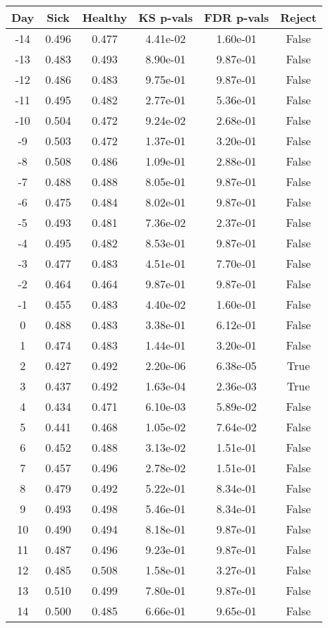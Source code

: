 \begin{tabular}{c|c|c|c|c|c}
Day &  Sick & Healthy &  KS p-vals & FDR p-vals & Reject\\
\hline
-14 & 0.496 &   0.477 &   4.41e-02 &   1.60e-01 &  False\\
-13 & 0.483 &   0.493 &   8.90e-01 &   9.87e-01 &  False\\
-12 & 0.486 &   0.483 &   9.75e-01 &   9.87e-01 &  False\\
-11 & 0.495 &   0.482 &   2.77e-01 &   5.36e-01 &  False\\
-10 & 0.504 &   0.472 &   9.24e-02 &   2.68e-01 &  False\\
 -9 & 0.503 &   0.472 &   1.37e-01 &   3.20e-01 &  False\\
 -8 & 0.508 &   0.486 &   1.09e-01 &   2.88e-01 &  False\\
 -7 & 0.488 &   0.488 &   8.05e-01 &   9.87e-01 &  False\\
 -6 & 0.475 &   0.484 &   8.02e-01 &   9.87e-01 &  False\\
 -5 & 0.493 &   0.481 &   7.36e-02 &   2.37e-01 &  False\\
 -4 & 0.495 &   0.482 &   8.53e-01 &   9.87e-01 &  False\\
 -3 & 0.477 &   0.483 &   4.51e-01 &   7.70e-01 &  False\\
 -2 & 0.464 &   0.464 &   9.87e-01 &   9.87e-01 &  False\\
 -1 & 0.455 &   0.483 &   4.40e-02 &   1.60e-01 &  False\\
  0 & 0.488 &   0.483 &   3.38e-01 &   6.12e-01 &  False\\
  1 & 0.474 &   0.483 &   1.44e-01 &   3.20e-01 &  False\\
  2 & 0.427 &   0.492 &   2.20e-06 &   6.38e-05 &   True\\
  3 & 0.437 &   0.492 &   1.63e-04 &   2.36e-03 &   True\\
  4 & 0.434 &   0.471 &   6.10e-03 &   5.89e-02 &  False\\
  5 & 0.441 &   0.468 &   1.05e-02 &   7.64e-02 &  False\\
  6 & 0.452 &   0.488 &   3.13e-02 &   1.51e-01 &  False\\
  7 & 0.457 &   0.496 &   2.78e-02 &   1.51e-01 &  False\\
  8 & 0.479 &   0.492 &   5.22e-01 &   8.34e-01 &  False\\
  9 & 0.493 &   0.498 &   5.46e-01 &   8.34e-01 &  False\\
 10 & 0.490 &   0.494 &   8.18e-01 &   9.87e-01 &  False\\
 11 & 0.487 &   0.496 &   9.23e-01 &   9.87e-01 &  False\\
 12 & 0.485 &   0.508 &   1.58e-01 &   3.27e-01 &  False\\
 13 & 0.510 &   0.499 &   7.80e-01 &   9.87e-01 &  False\\
 14 & 0.500 &   0.485 &   6.66e-01 &   9.65e-01 &  False\\
\end{tabular}